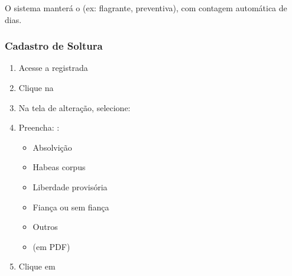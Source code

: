 \documentclass[letterpaper,10pt,brazil]{sphinxmanual}
\begin{document}
\sphinxAtStartPar
O sistema manterá o  (ex: flagrante, preventiva), com contagem automática de dias.


\subsubsection{Cadastro de Soltura}
\label{\detokenize{projud_25_cadastro reupreso:cadastro-de-soltura}}\begin{enumerate}
%
\item {} 
\sphinxAtStartPar
Acesse a  registrada

\item {} 
\sphinxAtStartPar
Clique na 

\item {} 
\sphinxAtStartPar
Na tela de alteração, selecione:
\sphinxhyphen{} 

\item {} 
\sphinxAtStartPar
Preencha:
\sphinxhyphen{} 
\sphinxhyphen{} 
\sphinxhyphen{} :
\begin{itemize}
\item {} 
\sphinxAtStartPar
Absolvição

\item {} 
\sphinxAtStartPar
Habeas corpus

\item {} 
\sphinxAtStartPar
Liberdade provisória

\item {} 
\sphinxAtStartPar
Fiança ou sem fiança

\item {} 
\sphinxAtStartPar
Outros

\end{itemize}
\begin{itemize}
\item {} 
\sphinxAtStartPar
{} (em PDF)

\end{itemize}

\item {} 
\sphinxAtStartPar
Clique em 

\end{enumerate}
\end{document}

